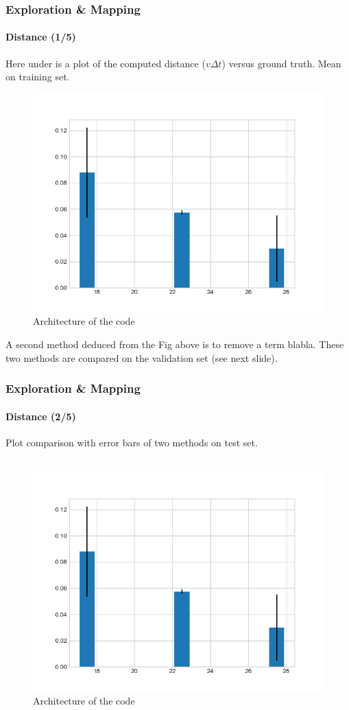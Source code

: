 \documentclass[10pt]{beamer}
\begin{document}
\begin{frame}
\frametitle{Exploration \& Mapping}
\framesubtitle{Distance (1/5)}
Here under is a plot of the computed distance ($v\Delta t$) versus ground truth. Mean on training set.
\begin{figure}[hbtp]
\centering
\label{fig:architecture}
\includegraphics[scale=0.45]{figures/hist-distance.png}
\caption{Architecture of the code}
\end{figure}
A second method deduced from the Fig above is to remove a term blabla. These two methods are compared on the validation set (see next slide).
\end{frame}


\begin{frame}
\frametitle{Exploration \& Mapping}
\framesubtitle{Distance (2/5)}
Plot comparison with error bars of two methods on test set.\\~\\
\begin{figure}[hbtp]
\centering
\label{fig:architecture}
\includegraphics[scale=0.45]{figures/hist-distance.png}
\caption{Architecture of the code}
\end{figure}
\end{frame}
\end{document}
